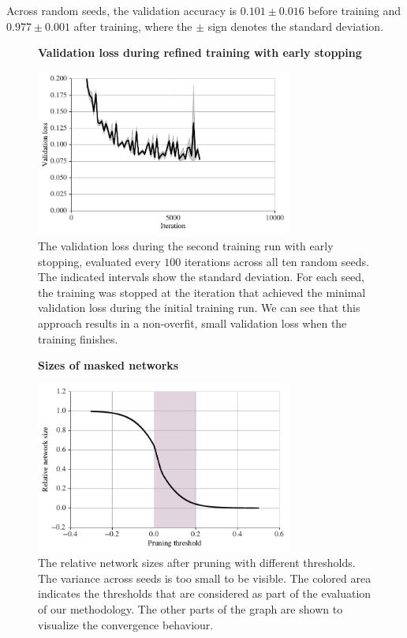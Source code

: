 \documentclass[12pt,final,twoside]{article}
\theoremstyle{plain}
\theoremstyle{definition}
\theoremstyle{remark}
\theoremstyle{named}
\begin{document}
Across random seeds, the validation accuracy is $0.101 \pm 0.016$ before training and $0.977 \pm 0.001$ after training, where the $\pm$ sign denotes the standard deviation.

\newpage

\begin{figure}[h!]
  \centering
  \textbf{Validation loss during refined training with early stopping}\par\medskip
  \includegraphics[width=0.75\textwidth]{plots/refined_trainings.pdf}
  \caption{The validation loss during the second training run with early stopping, evaluated every $100$ iterations across all ten random seeds. The indicated intervals show the standard deviation. For each seed, the training was stopped at the iteration that achieved the minimal validation loss during the initial training run. We can see that this approach results in a non-overfit, small validation loss when the training finishes.}
  \label{fig:refined-training}
\end{figure}

\begin{figure}[h!]
  \centering
  \textbf{Sizes of masked networks}\par\medskip
  \includegraphics[width=0.75\textwidth]{plots/pruned_sizes.pdf}
  \caption{The relative network sizes after pruning with different thresholds. The variance across seeds is too small to be visible. The colored area indicates the thresholds that are considered as part of the evaluation of our methodology. The other parts of the graph are shown to visualize the convergence behaviour. }
  \label{fig:pruned-sizes}
\end{figure}
\end{document}
